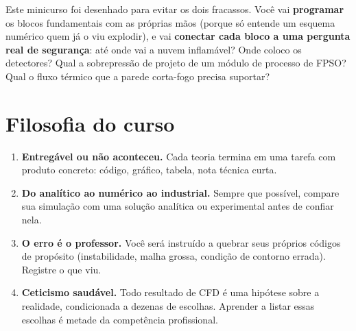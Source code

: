 \documentclass[10pt,a4paper,twocolumn,openany]{report}
\begin{document}
Este minicurso foi desenhado para evitar os dois fracassos. Você vai
\textbf{programar} os blocos fundamentais com as próprias mãos (porque só
entende um esquema numérico quem já o viu explodir), e vai \textbf{conectar
cada bloco a uma pergunta real de segurança}: até onde vai a nuvem
inflamável? Onde coloco os detectores? Qual a sobrepressão de projeto de um
módulo de processo de FPSO? Qual o fluxo térmico que a parede corta-fogo
precisa suportar?

\section*{Filosofia do curso}
\begin{enumerate}
  \item \textbf{Entregável ou não aconteceu.} Cada teoria termina em uma tarefa
        com produto concreto: código, gráfico, tabela, nota técnica curta.
  \item \textbf{Do analítico ao numérico ao industrial.} Sempre que possível,
        compare sua simulação com uma solução analítica ou experimental antes
        de confiar nela.
  \item \textbf{O erro é o professor.} Você será instruído a quebrar seus
        próprios códigos de propósito (instabilidade, malha grossa, condição de
        contorno errada). Registre o que viu.
  \item \textbf{Ceticismo saudável.} Todo resultado de CFD é uma hipótese
        sobre a realidade, condicionada a dezenas de escolhas. Aprender a
        listar essas escolhas é metade da competência profissional.
\end{enumerate}
\end{document}
